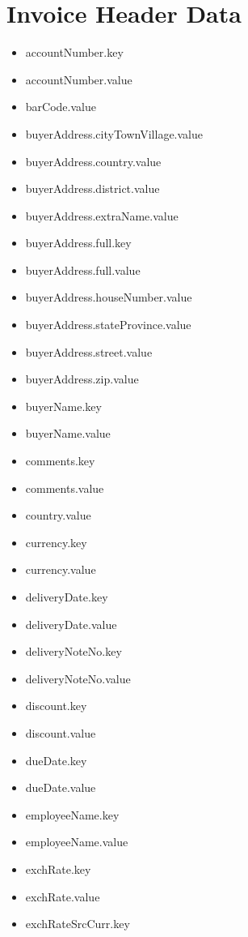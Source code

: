 \cleardoublepage


\section{Invoice Header Data}
\begin{multicols}{2}
	\label{invoice-header}
	\begin{itemize}
		\setlength\multicolsep{0pt}
\item[] accountNumber.key
\item[] accountNumber.value
\item[] barCode.value
\item[] buyerAddress.cityTownVillage.value
\item[] buyerAddress.country.value
\item[] buyerAddress.district.value
\item[] buyerAddress.extraName.value
\item[] buyerAddress.full.key
\item[] buyerAddress.full.value
\item[] buyerAddress.houseNumber.value
\item[] buyerAddress.stateProvince.value
\item[] buyerAddress.street.value
\item[] buyerAddress.zip.value
\item[] buyerName.key
\item[] buyerName.value
\item[] comments.key
\item[] comments.value
\item[] country.value
\item[] currency.key
\item[] currency.value
\item[] deliveryDate.key
\item[] deliveryDate.value
\item[] deliveryNoteNo.key
\item[] deliveryNoteNo.value
\item[] discount.key
\item[] discount.value
\item[] dueDate.key
\item[] dueDate.value
\item[] employeeName.key
\item[] employeeName.value
\item[] exchRate.key
\item[] exchRate.value
\item[] exchRateSrcCurr.key

\end{itemize}
\end{multicols}
